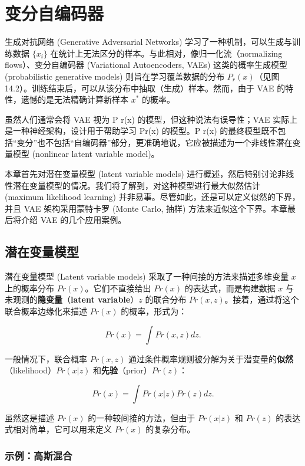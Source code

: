 \chapter{变分自编码器}

生成对抗网络 (Generative Adversarial Networks) 学习了一种机制，可以生成与训练数据 \(\{x_i\}\) 在统计上无法区分的样本。与此相对，像归一化流（normalizing flows）、变分自编码器 (Variational Autoencoders, VAEs) 这类的概率生成模型 (probabilistic generative models) 则旨在学习覆盖数据的分布 \(P_r(x)\)（见图 14.2）。训练结束后，可以从该分布中抽取（生成）样本。然而，由于 VAE 的特性，遗憾的是无法精确计算新样本 \(x^*\) 的概率。

虽然人们通常会将 VAE 视为 P r(x) 的模型，但这种说法有误导性；VAE 实际上是一种神经架构，设计用于帮助学习 Pr(x) 的模型。P r(x) 的最终模型既不包括“变分”也不包括“自编码器”部分，更准确地说，它应被描述为一个非线性潜在变量模型 (nonlinear latent variable model)。

本章首先对潜在变量模型 (latent variable models) 进行概述，然后特别讨论非线性潜在变量模型的情况。我们将了解到，对这种模型进行最大似然估计 (maximum likelihood learning) 并非易事。尽管如此，还是可以定义似然的下界，并且 VAE 架构采用蒙特卡罗 (Monte Carlo, 抽样) 方法来近似这个下界。本章最后将介绍 VAE 的几个应用案例。
\section{潜在变量模型}

潜在变量模型 (Latent variable models) 采取了一种间接的方法来描述多维变量 \(x\) 上的概率分布 \(Pr(x)\)。它们不直接给出 \(Pr(x)\) 的表达式，而是构建数据 \(x\) 与未观测的\textbf{隐变量}（\textbf{latent variable}）\(z\) 的联合分布 \(Pr(x, z)\)。接着，通过将这个联合概率边缘化来描述 \(Pr(x)\) 的概率，形式为：

\begin{equation}
Pr(x) = \int Pr(x, z)dz. 
\end{equation}

一般情况下，联合概率 \(Pr(x, z)\) 通过条件概率规则被分解为关于潜变量的\textbf{似然}（likelihood）\(Pr(x|z)\) 和\textbf{先验}（prior）\(Pr(z)\)：

\begin{equation}
Pr(x) = \int Pr(x|z)Pr(z)dz. 
\end{equation}

虽然这是描述 \(Pr(x)\) 的一种较间接的方法，但由于 \(Pr(x|z)\) 和 \(Pr(z)\) 的表达式相对简单，它可以用来定义 \(Pr(x)\) 的复杂分布。

\subsection{示例：高斯混合}

